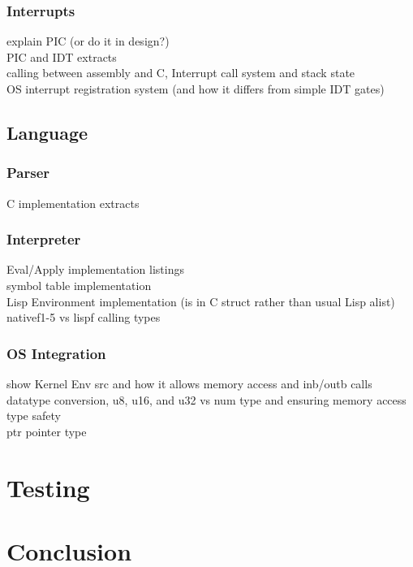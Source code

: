 \documentclass[11pt]{report}
\begin{document}
\subsection{Interrupts}
explain PIC (or do it in design?) \\
PIC and IDT extracts \\
calling between assembly and C, Interrupt call system and stack state \\
OS interrupt registration system (and how it differs from simple IDT gates) \\

\section{Language}
\subsection{Parser}
C implementation extracts \\

\subsection{Interpreter}
Eval/Apply implementation listings \\
symbol table implementation \\
Lisp Environment implementation (is in C struct rather than usual Lisp alist) \\
nativef1-5 vs lispf calling types \\

\subsection{OS Integration}
show Kernel Env src and how it allows memory access and inb/outb calls \\
datatype conversion, u8, u16, and u32 vs num type and ensuring memory access type safety \\
ptr pointer type \\

\chapter{Testing}


\chapter{Conclusion}




\end{document}
